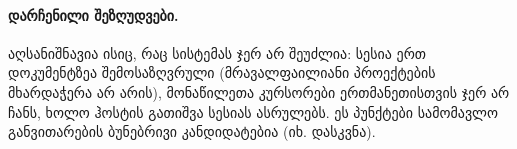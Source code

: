 \paragraph{დარჩენილი შეზღუდვები.}
აღსანიშნავია ისიც, რაც სისტემას ჯერ არ შეუძლია: სესია ერთ დოკუმენტზეა
შემოსაზღვრული (მრავალფაილიანი პროექტების მხარდაჭერა არ არის), მონაწილეთა
კურსორები ერთმანეთისთვის ჯერ არ ჩანს, ხოლო ჰოსტის გათიშვა სესიას
ასრულებს. ეს პუნქტები სამომავლო განვითარების ბუნებრივი კანდიდატებია
(იხ. დასკვნა).
